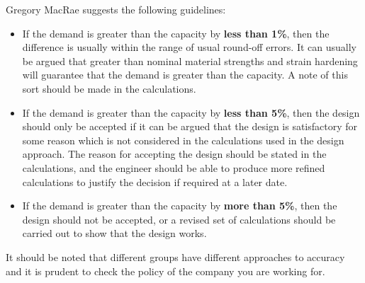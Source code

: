 Gregory MacRae suggests the following guidelines:
\begin{itemize}
\item If the demand is greater than the capacity by \textbf{less than 1\%}, then the difference is usually within the range of usual round-off errors. It can usually be argued that greater than nominal material strengths and strain hardening will guarantee that the demand is greater than the capacity. A note of this sort should be made in the calculations.
\item If the demand is greater than the capacity by \textbf{less than 5\%}, then the design should only be accepted if it can be argued that the design is satisfactory for some reason which is not considered in the calculations used in the design approach. The reason for accepting the design should be stated in the calculations, and the engineer should be able to produce more refined calculations to justify the decision if required at a later date.
\item If the demand is greater than the capacity by \textbf{more than 5\%}, then the design should not be accepted, or a revised set of calculations should be carried out to show that the design works.
\end{itemize}
It should be noted that different groups have different approaches to accuracy and it is prudent to check the policy of the company you are working for.